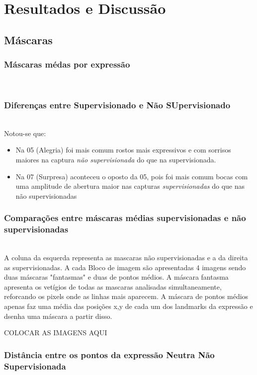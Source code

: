 \section{Resultados e Discussão}
\label{sec:resultados}

\subsection{Máscaras}
\subsubsection{Máscaras médas por expressão}\mbox{}\\
\subsubsection{Diferenças entre Supervisionado e Não SUpervisionado}\mbox{}\\
Notou-se que:
\begin{itemize}
    \item Na 05 (Alegria) foi mais comum rostos mais expressivos e com sorrisos maiores na captura \emph{não supervisionada} do que na supervisionada.
    \item Na 07 (Surpresa) aconteceu o oposto da 05, pois foi mais comum bocas com uma amplitude de abertura maior nas capturas \emph{supervisionadas} do que nas não supervisionadas
\end{itemize}

\subsubsection{Comparações entre máscaras médias supervisionadas e não supervisionadas}\mbox{}\\

A coluna da esquerda representa as mascaras não supervisionadas e a da direita as supervisionadas. A cada Bloco de imagem são apresentadas 4 imagens sendo duas máscaras "fantasmas" e duas de pontos médios.
A máscara fantasma apresenta os vetígios de todas as mascaras analisadas simultaneamente, reforcando os pixels onde as linhas mais aparecem.
A máscara de pontos médios apenas faz uma média das posições x,y de cada um dos landmarks da expressão e dsenha uma máscara a partir disso.

COLOCAR AS IMAGENS AQUI


\subsubsection{Distância entre os pontos da expressão Neutra Não Supervisionada}\mbox{}\\

